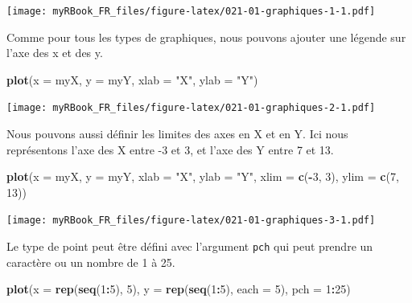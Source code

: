 \documentclass[
]{book}
\newenvironment{Shaded}{\begin{snugshade}}{\end{snugshade}}
\newcommand{\DataTypeTok}[1]{\textcolor[rgb]{0.13,0.29,0.53}{#1}}
\newcommand{\DecValTok}[1]{\textcolor[rgb]{0.00,0.00,0.81}{#1}}
\newcommand{\KeywordTok}[1]{\textcolor[rgb]{0.13,0.29,0.53}{\textbf{#1}}}
\newcommand{\NormalTok}[1]{#1}
\newcommand{\OperatorTok}[1]{\textcolor[rgb]{0.81,0.36,0.00}{\textbf{#1}}}
\newcommand{\StringTok}[1]{\textcolor[rgb]{0.31,0.60,0.02}{#1}}
\begin{document}
\texttt{[image: myRBook\_FR\_files/figure-latex/021-01-graphiques-1-1.pdf]}

Comme pour tous les types de graphiques, nous pouvons ajouter une légende sur l'axe des x et des y.

\begin{Shaded}
\begin{Highlighting}[]
\KeywordTok{plot}\NormalTok{(}\DataTypeTok{x =}\NormalTok{ myX, }\DataTypeTok{y =}\NormalTok{ myY, }
  \DataTypeTok{xlab =} \StringTok{"X"}\NormalTok{, }\DataTypeTok{ylab =} \StringTok{"Y"}\NormalTok{)}
\end{Highlighting}
\end{Shaded}

\texttt{[image: myRBook\_FR\_files/figure-latex/021-01-graphiques-2-1.pdf]}

Nous pouvons aussi définir les limites des axes en X et en Y. Ici nous représentons l'axe des X entre -3 et 3, et l'axe des Y entre 7 et 13.

\begin{Shaded}
\begin{Highlighting}[]
\KeywordTok{plot}\NormalTok{(}\DataTypeTok{x =}\NormalTok{ myX, }\DataTypeTok{y =}\NormalTok{ myY, }
  \DataTypeTok{xlab =} \StringTok{"X"}\NormalTok{, }\DataTypeTok{ylab =} \StringTok{"Y"}\NormalTok{, }
  \DataTypeTok{xlim =} \KeywordTok{c}\NormalTok{(}\OperatorTok{-}\DecValTok{3}\NormalTok{, }\DecValTok{3}\NormalTok{), }\DataTypeTok{ylim =} \KeywordTok{c}\NormalTok{(}\DecValTok{7}\NormalTok{, }\DecValTok{13}\NormalTok{))}
\end{Highlighting}
\end{Shaded}

\texttt{[image: myRBook\_FR\_files/figure-latex/021-01-graphiques-3-1.pdf]}

Le type de point peut être défini avec l'argument \texttt{pch} qui peut prendre un caractère ou un nombre de 1 à 25.

\begin{Shaded}
\begin{Highlighting}[]
\KeywordTok{plot}\NormalTok{(}\DataTypeTok{x =} \KeywordTok{rep}\NormalTok{(}\KeywordTok{seq}\NormalTok{(}\DecValTok{1}\OperatorTok{:}\DecValTok{5}\NormalTok{), }\DecValTok{5}\NormalTok{), }\DataTypeTok{y =} \KeywordTok{rep}\NormalTok{(}\KeywordTok{seq}\NormalTok{(}\DecValTok{1}\OperatorTok{:}\DecValTok{5}\NormalTok{), }\DataTypeTok{each =} \DecValTok{5}\NormalTok{),}
  \DataTypeTok{pch =} \DecValTok{1}\OperatorTok{:}\DecValTok{25}\NormalTok{)}
\end{Highlighting}
\end{Shaded}
\end{document}
